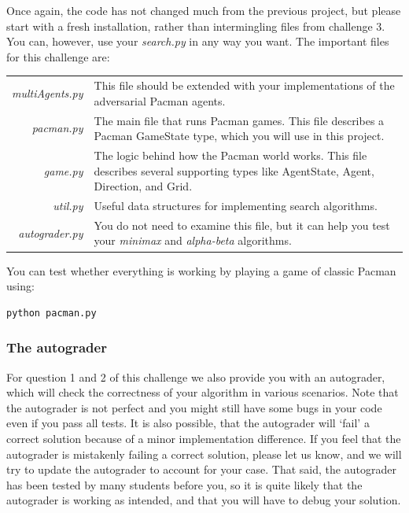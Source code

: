 \documentclass{article}
\begin{document}
Once again, the code has not changed much from the previous project, but please start with a fresh installation, rather than intermingling files from challenge 3. You can, however, use your \emph{search.py} in any way you want. The important files for this challenge are:

\vspace{10pt}
\noindent
\begin{tabular}{r p{}}
\emph{multiAgents.py} & This file should be extended with your implementations of the adversarial Pacman agents. \\
\emph{pacman.py} & The main file that runs Pacman games. This file describes a Pacman GameState type, which you will use in this project.\\
\emph{game.py} & The logic behind how the Pacman world works. This file describes several supporting types like AgentState, Agent, Direction, and Grid.\\
\emph{util.py} & Useful data structures for implementing search algorithms.\\
\emph{autograder.py} & You do not need to examine this file, but it can help you test your \emph{minimax} and \emph{alpha-beta} algorithms.
\end{tabular}
\vspace{10pt}

You can test whether everything is working by playing a game of classic Pacman using:

\begin{verbatim}
python pacman.py
\end{verbatim}

\subsubsection{The autograder}
For question 1 and 2 of this challenge we also provide you with an autograder, which will check the correctness of your algorithm in various scenarios. Note that the autograder is not perfect and you might still have some bugs in your code even if you pass all tests. It is also possible, that the autograder will `fail' a correct solution because of a minor implementation difference. If you feel that the autograder is mistakenly failing a correct solution, please let us know, and we will try to update the autograder to account for your case. That said, the autograder has been tested by many students before you, so it is quite likely that the autograder is working as intended, and that you will have to debug your solution.
\end{document}
